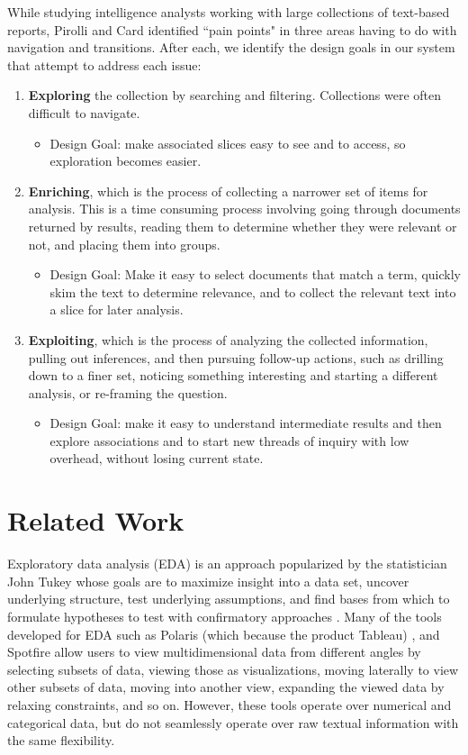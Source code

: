 \documentclass{sig-alternate}
\newcommand{\strong}[1] {\textbf{#1}}
\begin{document}
While studying intelligence analysts working with large collections of text-based reports, Pirolli and Card \cite{pirolli_sensemaking_2005} identified ``pain points" in three areas having to do with navigation and transitions. After each, we identify the design goals in our system that attempt to address each issue:
\begin{enumerate}
\item \strong{Exploring} the collection by searching and filtering. Collections were often difficult to navigate. 
	\begin{itemize}
		\item Design Goal: make associated slices  easy to see and to access, so exploration  becomes easier. 
	\end{itemize}
\item \strong{Enriching}, which is the process of collecting a narrower set of items for analysis. This is a time consuming process involving going through documents returned by results, reading them to determine whether they were relevant or not, and placing them into groups.
	\begin{itemize}
		\item Design Goal: Make it easy to select documents that match a term, quickly skim the text to determine relevance, and to collect the relevant text into a slice for later analysis.
	\end{itemize}
\item \strong{Exploiting}, which is the process of analyzing the collected information, pulling out inferences, and then pursuing  follow-up actions, such as drilling down to a finer set, noticing something interesting and starting a different analysis, or re-framing the question.
	\begin{itemize}
		\item Design Goal: make it easy to understand intermediate results and then explore associations and to start new threads of inquiry with low overhead,  without losing current state.
	\end{itemize}
\end{enumerate}

\section{Related Work}

Exploratory data analysis  (EDA) is an approach popularized by the statistician John Tukey whose goals are to maximize insight into a data set, uncover underlying structure, test underlying assumptions, and find bases from which to formulate hypotheses to test with confirmatory approaches \cite{tukey1977exploratory,tukey1980we}.  Many of the tools developed for EDA such as Polaris (which because the product Tableau) \cite{stolte2002polaris}, and Spotfire \cite{ahlberg1996spotfire} allow users to view multidimensional data from different angles by selecting subsets of data, viewing those as visualizations, moving laterally to view other subsets of data, moving into another view, expanding the viewed data by relaxing constraints, and so on.  However, these tools operate over numerical and categorical data, but do not seamlessly operate over raw textual information with the same flexibility. 
\end{document}
